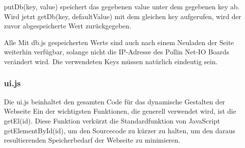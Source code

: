 \textrm{putDb(key, value)} speichert das gegebenen \textrm{value} unter dem
gegebenen \textrm{key} ab. Wird jetzt \textrm{getDb(key, defaultValue)} mit dem
gleichen \textrm{key} aufgerufen, wird der zuvor abgespeicherte Wert
zurückgegeben.

Alle Mit \textrm{db.js} gespeicherten Werte sind auch nach einem Neuladen der
Seite weiterhin verfügbar, solange nicht die IP-Adresse des Pollin Net-IO Boards
verändert wird. Die verwendeten Keys müssen natürlich eindeutig sein.

\subsubsection{ui.js}
Die \textrm{ui.js} beinhaltet den gesamten Code für das dynamische Gestalten der
Webseite\newline
Ein der wichtigsten Funktionen, die generell verwendet wird, ist die
\textrm{getEl(id)}.
Diese Funktion verkürzt die Standardfunktion von JavaScript
\textrm{getElementById(id)}, um den Sourcecode zu kürzer zu halten,
um den daraus resultierenden Speicherbedarf der Webseite zu
minimieren.\newline

